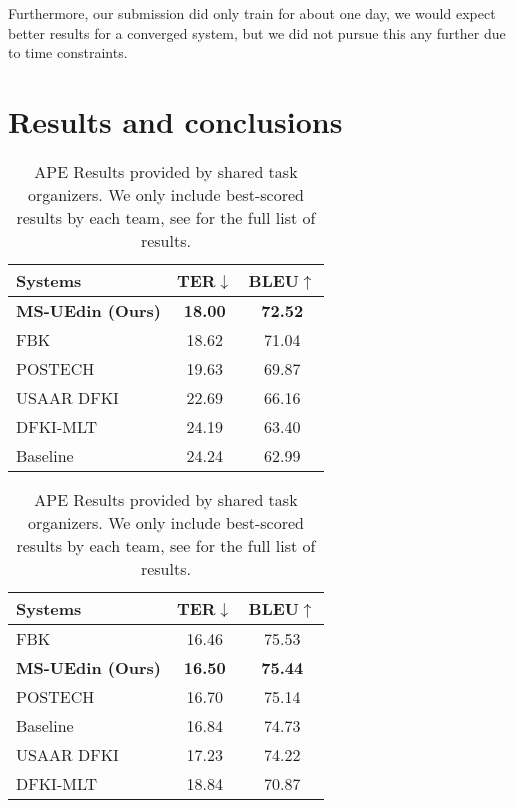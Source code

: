 \documentclass[11pt,a4paper]{article}
\begin{document}
Furthermore, our submission did only train for about one day, we would expect better results for a converged system, but we did not pursue this any further due to time constraints.

\section{Results and conclusions}

\begin{table}[t]\centering
\begin{subtable}[t]{7cm}\centering
\begin{tabular}{p{4cm}cc} \toprule
Systems & \textbf{TER$\downarrow$} & BLEU$\uparrow$ \\ \midrule
\bf MS-UEdin (Ours) & \bf 18.00 & \bf 72.52 \\
FBK  &18.62&	71.04\\
POSTECH &	19.63&	69.87\\
USAAR DFKI &	22.69&	66.16\\
DFKI-MLT &	24.19&	63.40\\
Baseline&	24.24	&62.99\\ \bottomrule
\end{tabular}
\caption{PBSMT sub-task}\label{pbmt}
\end{subtable}

\vspace{0.5cm}

\begin{subtable}[t]{7cm}\centering
\begin{tabular}{p{4cm}cc}\toprule
Systems & \textbf{TER$\downarrow$} & BLEU$\uparrow$ \\ \midrule
FBK & 16.46&	75.53 \\
\bf MS-UEdin (Ours)	& \bf 16.50& \bf	75.44 \\
POSTECH &16.70&	75.14 \\
Baseline&	16.84&	74.73 \\
USAAR DFKI&	17.23&	74.22 \\
DFKI-MLT&	18.84&	70.87 \\ \bottomrule
\end{tabular}
\caption{NMT sub-task}\label{nmt}
\end{subtable}
\caption{APE Results provided by shared task organizers. We only include best-scored results by each team, see  for the full list of results.}
\label{org}
\end{table}
\end{document}
